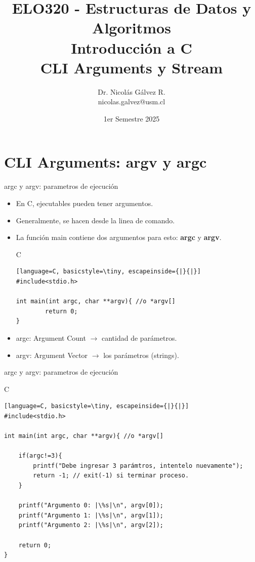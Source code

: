 \documentclass{beamer}
\title{ELO320 - Estructuras de Datos y Algoritmos\\Introducción a C\\CLI Arguments y Stream}
\author{Dr. Nicolás Gálvez R.\\{\small nicolas.galvez@usm.cl}}
\institute{Ing. Civil Telemática - Departamento de Electrónica}
\date{1er Semestre 2025}
\begin{document}
\frame{\titlepage}

%
%
\section{CLI Arguments: argv y argc}

\begin{frame}[fragile]{argc y argv: parametros de ejecución}
\begin{itemize}
	\item En C, ejecutables pueden tener argumentos. 
	\item Generalmente, se hacen desde la linea de comando. 
	\item La función main contiene dos argumentos para esto: \textbf{argc} y \textbf{argv}.
\begin{exampleblock}{C}
\begin{lstlisting}[language=C, basicstyle=\tiny, escapeinside={|}{|}]
#include<stdio.h>

int main(int argc, char **argv){ //o *argv[]
		return 0;
}
\end{lstlisting}
\end{exampleblock}
	\item argc: Argument Count $\rightarrow$ cantidad de parámetros.
	\item argv: Argument Vector $\rightarrow$ los parámetros (strings).
\end{itemize}
\end{frame}


\begin{frame}[fragile]{argc y argv: parametros de ejecución}
\begin{exampleblock}{C}
\begin{lstlisting}[language=C, basicstyle=\tiny, escapeinside={|}{|}]
#include<stdio.h>

int main(int argc, char **argv){ //o *argv[]

	if(argc!=3){
		printf("Debe ingresar 3 parámtros, intentelo nuevamente");
		return -1; // exit(-1) si terminar proceso.
	}

	printf("Argumento 0: |\%s|\n", argv[0]);
	printf("Argumento 1: |\%s|\n", argv[1]);
	printf("Argumento 2: |\%s|\n", argv[2]);

	return 0;
}
\end{lstlisting}
\end{exampleblock}
\end{frame}
\end{document}

